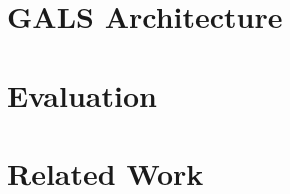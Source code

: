 \documentclass[sigplan,screen]{acmart}
\begin{document}
\section{GALS Architecture}
\label{sec.gals}

\section{Evaluation}
\label{sec.eval}

\section{Related Work}
\label{sec.related}
\end{document}
